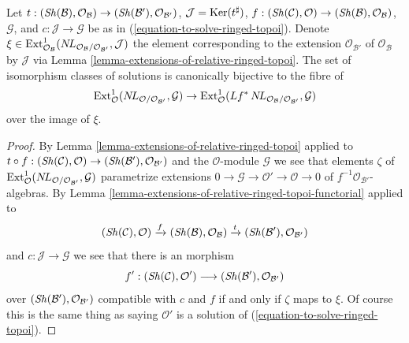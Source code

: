 \begin{lemma}
\label{lemma-parametrize-solutions-ringed-topoi}
Let $t : (\mathop{\mathit{Sh}}\nolimits(\mathcal{B}), \mathcal{O}_\mathcal{B}) \to
(\mathop{\mathit{Sh}}\nolimits(\mathcal{B}'), \mathcal{O}_{\mathcal{B}'})$,
$\mathcal{J} = \mathop{\mathrm{Ker}}(t^\sharp)$,
$f : (\mathop{\mathit{Sh}}\nolimits(\mathcal{C}), \mathcal{O}) \to
(\mathop{\mathit{Sh}}\nolimits(\mathcal{B}), \mathcal{O}_\mathcal{B})$, $\mathcal{G}$, and
$c : \mathcal{J} \to \mathcal{G}$ be as in
(\ref{equation-to-solve-ringed-topoi}).
Denote $\xi \in \mathop{\mathrm{Ext}}\nolimits^1_{\mathcal{O}_\mathcal{B}}(
\mathop{N\!L}\nolimits_{\mathcal{O}_\mathcal{B}/\mathcal{O}_{\mathcal{B}'}}, \mathcal{J})$
the element corresponding to the extension $\mathcal{O}_{\mathcal{B}'}$
of $\mathcal{O}_\mathcal{B}$ by $\mathcal{J}$ via
Lemma \ref{lemma-extensions-of-relative-ringed-topoi}.
The set of isomorphism classes of solutions is canonically bijective
to the fibre of
$$
\mathop{\mathrm{Ext}}\nolimits^1_\mathcal{O}(\mathop{N\!L}\nolimits_{\mathcal{O}/\mathcal{O}_{\mathcal{B}'}},
\mathcal{G})\to
\mathop{\mathrm{Ext}}\nolimits^1_\mathcal{O}(
Lf^*\mathop{N\!L}\nolimits_{\mathcal{O}_\mathcal{B}/\mathcal{O}_{\mathcal{B}'}}, \mathcal{G})
$$
over the image of $\xi$.
\end{lemma}

\begin{proof}
By Lemma \ref{lemma-extensions-of-relative-ringed-topoi}
applied to $t \circ f : (\mathop{\mathit{Sh}}\nolimits(\mathcal{C}), \mathcal{O}) \to
(\mathop{\mathit{Sh}}\nolimits(\mathcal{B}'), \mathcal{O}_{\mathcal{B}'})$
and the $\mathcal{O}$-module $\mathcal{G}$
we see that elements $\zeta$ of
$\mathop{\mathrm{Ext}}\nolimits^1_\mathcal{O}(\mathop{N\!L}\nolimits_{\mathcal{O}/\mathcal{O}_{\mathcal{B}'}},
\mathcal{G})$
parametrize extensions
$0 \to \mathcal{G} \to \mathcal{O}' \to \mathcal{O} \to 0$
of $f^{-1}\mathcal{O}_{\mathcal{B}'}$-algebras. By
Lemma \ref{lemma-extensions-of-relative-ringed-topoi-functorial} applied
to
$$
(\mathop{\mathit{Sh}}\nolimits(\mathcal{C}), \mathcal{O}) \xrightarrow{f}
(\mathop{\mathit{Sh}}\nolimits(\mathcal{B}), \mathcal{O}_\mathcal{B}) \xrightarrow{t}
(\mathop{\mathit{Sh}}\nolimits(\mathcal{B}'), \mathcal{O}_{\mathcal{B}'})
$$
and $c : \mathcal{J} \to \mathcal{G}$
we see that there is an morphism
$$
f' : 
(\mathop{\mathit{Sh}}\nolimits(\mathcal{C}), \mathcal{O}')
\longrightarrow
(\mathop{\mathit{Sh}}\nolimits(\mathcal{B}'), \mathcal{O}_{\mathcal{B}'})
$$
over $(\mathop{\mathit{Sh}}\nolimits(\mathcal{B}'), \mathcal{O}_{\mathcal{B}'})$
compatible with $c$ and $f$ if and only if
$\zeta$ maps to $\xi$. Of course this is the same thing as saying
$\mathcal{O}'$ is a solution of (\ref{equation-to-solve-ringed-topoi}).
\end{proof}






















